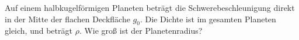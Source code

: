 \begin{Exercise}[label = halfplan, title = Ein halber Planet, origin = {4.Runde IPhO 2015, Kurzaufgabe}, difficulty = 3]
	Auf einem halbkugelförmigen Planeten beträgt die Schwerebeschleunigung direkt in der Mitte der flachen Deckfläche $g_0$.  Die Dichte ist im gesamten Planeten gleich, und beträgt $\rho$. Wie groß ist der Planetenradius?
\end{Exercise}